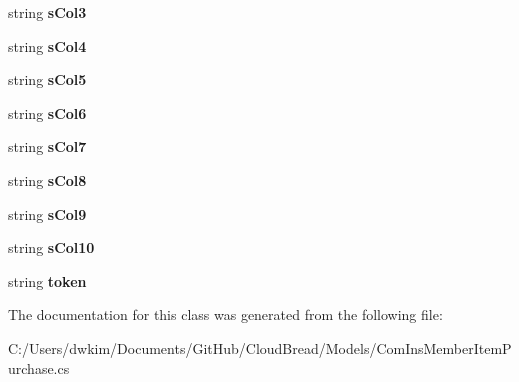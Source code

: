 \begin{DoxyCompactItemize}
\item 
string {\bfseries s\+Col3}\hypertarget{a00051_ae8801be4130afe2248fafa1edaebb32d}{}\label{a00051_ae8801be4130afe2248fafa1edaebb32d}

\item 
string {\bfseries s\+Col4}\hypertarget{a00051_ae09032c48fefe3c962d4f3716258eda8}{}\label{a00051_ae09032c48fefe3c962d4f3716258eda8}

\item 
string {\bfseries s\+Col5}\hypertarget{a00051_a5b05b26e1f8ad68b813e1879f50a2f5b}{}\label{a00051_a5b05b26e1f8ad68b813e1879f50a2f5b}

\item 
string {\bfseries s\+Col6}\hypertarget{a00051_a85f2ba6c9dd48ec203c2dd845dfe2ae7}{}\label{a00051_a85f2ba6c9dd48ec203c2dd845dfe2ae7}

\item 
string {\bfseries s\+Col7}\hypertarget{a00051_ad4b2fc1b684e2b24dfe9d96230fc4669}{}\label{a00051_ad4b2fc1b684e2b24dfe9d96230fc4669}

\item 
string {\bfseries s\+Col8}\hypertarget{a00051_a57d0082b701d1d009b068af5d5e6beb3}{}\label{a00051_a57d0082b701d1d009b068af5d5e6beb3}

\item 
string {\bfseries s\+Col9}\hypertarget{a00051_aafefdc8c6bfe8cd73a686a64beb52866}{}\label{a00051_aafefdc8c6bfe8cd73a686a64beb52866}

\item 
string {\bfseries s\+Col10}\hypertarget{a00051_a52bbee91e8589d1192e4b3c829696eee}{}\label{a00051_a52bbee91e8589d1192e4b3c829696eee}

\item 
string {\bfseries token}\hypertarget{a00051_a6d378c66885ebfe59b85dcb836b6ce1f}{}\label{a00051_a6d378c66885ebfe59b85dcb836b6ce1f}

\end{DoxyCompactItemize}


The documentation for this class was generated from the following file\+:\begin{DoxyCompactItemize}
\item 
C\+:/\+Users/dwkim/\+Documents/\+Git\+Hub/\+Cloud\+Bread/\+Models/Com\+Ins\+Member\+Item\+Purchase.\+cs\end{DoxyCompactItemize}
